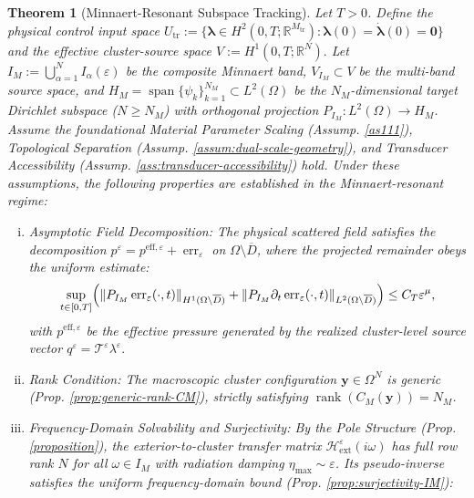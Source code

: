 \documentclass[11pt,a4paper]{article}
\numberwithin{equation}{section}
\newtheorem{theorem}{Theorem}[section]
\begin{document}
\begin{theorem}[Minnaert-Resonant Subspace Tracking]
\label{thm:Minnaert-tracking_main}
 Let $T>0$. Define the physical control input space $U_{\mathrm{tr}} := \{\boldsymbol{\lambda} \in H^2(0,T; \mathbb{R}^{M_{\mathrm{tr}}}) : \boldsymbol{\lambda}(0) = \dot{\boldsymbol{\lambda}}(0) = \mathbf{0}\}$ and the effective cluster-source space $V := H^1(0,T; \mathbb{R}^N).$ Let $I_M := \bigcup_{\alpha=1}^N I_\alpha(\varepsilon)$ be the composite Minnaert band, $V_{I_M}\subset V$ be the multi-band source space, and $H_M = \operatorname{span}\{\psi_k\}_{k=1}^{N_M} \subset L^2(\Omega)$ be the $N_M$-dimensional target Dirichlet subspace ($N\ge N_M$) with orthogonal projection $P_{I_M}: L^2(\Omega) \to H_M$. 
\newline
Assume the foundational Material Parameter Scaling (Assump. \ref{as111}), Topological Separation (Assump. \ref{assum:dual-scale-geometry}), and Transducer Accessibility (Assump. \ref{ass:transducer-accessibility}) hold. Under these assumptions, the following properties are established in the
Minnaert-resonant regime:
\begin{enumerate}[(i)]
    \item \textit{Asymptotic Field Decomposition:} The physical scattered field satisfies the decomposition $p^\varepsilon = p^{\mathrm{eff},\varepsilon} + \operatorname{err}_\varepsilon$ on $\Omega \setminus \overline{D}$, where the projected remainder obeys the uniform estimate:
    \begin{equation}
    \label{eq:f-eps-H-1}
        \sup_{t\in[0,T]} \Bigl( \|P_{I_M}\operatorname{err}_{\varepsilon}(\cdot,t)\|_{H^1(\Omega\setminus \overline{D})} + \|P_{I_M}\partial_t\operatorname{err}_{\varepsilon}(\cdot,t)\|_{L^2(\Omega\setminus \overline{D})} \Bigr) \le C_T\varepsilon^\mu,
    \end{equation}
    with $p^{\mathrm{eff},\varepsilon}$ be the effective pressure generated by the realized cluster-level source vector $q^\varepsilon=\mathcal{T}^\varepsilon\lambda^\varepsilon.$
    \item \textit{Rank Condition:} The macroscopic cluster configuration $\mathbf{y} \in \Omega^N$ is generic (Prop. \ref{prop:generic-rank-CM}), strictly satisfying $\operatorname{rank}(C_M(\mathbf{y})) = N_M$.
    \item \textit{Frequency-Domain Solvability and Surjectivity:} By the Pole Structure (Prop. \ref{proposition}), the exterior-to-cluster transfer matrix $\mathcal{H}_{\mathrm{ext}}^\varepsilon(i\omega)$ has full row rank $N$ for all $\omega\in I_M$ with radiation damping $\eta_{\max} \sim \varepsilon$. Its pseudo-inverse satisfies the uniform frequency-domain bound (Prop. \ref{prop:surjectivity-IM}):

\end{enumerate}
\end{theorem}
\end{document}
